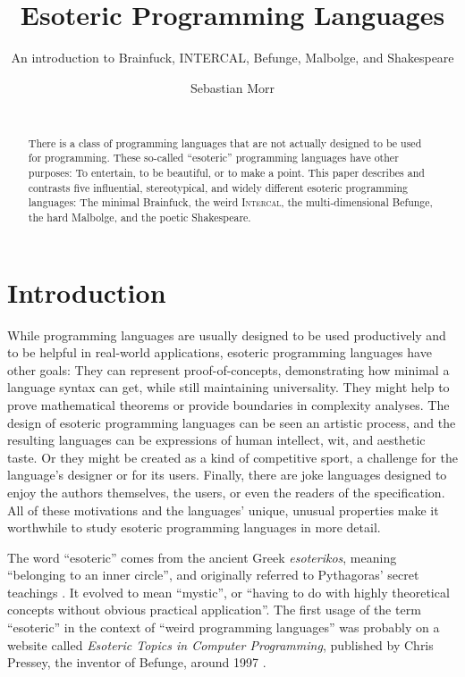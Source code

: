 \documentclass{sig-alternate}
\title{Esoteric Programming Languages}
\subtitle{An introduction to Brainfuck, INTERCAL, Befunge, Malbolge, and Shakespeare}
\author{\alignauthor Sebastian Morr\\\affaddr{Braunschweig University of Technology}\\\email{sebastian@morr.cc}}
\newcommand{\ic}{\textsc{In\-ter\-cal}}
\begin{document}
\maketitle

\begin{abstract}
    There is a class of programming languages that are not actually designed to be used for programming. These so-called “esoteric” programming languages have other purposes: To entertain, to be beautiful, or to make a point.
    This paper describes and contrasts five influential, stereotypical, and widely different esoteric programming languages: The minimal Brainfuck, the weird \ic{}, the multi-dimensional Befunge, the hard Malbolge, and the poetic Shakespeare.
\end{abstract}

\section{Introduction}
\label{introduction}

While programming languages are usually designed to be used productively and to be helpful in real-world applications, esoteric programming languages have other goals: They can represent proof-of-concepts, demonstrating how minimal a language syntax can get, while still maintaining universality. They might help to prove mathematical theorems or provide boundaries in complexity analyses. The design of esoteric programming languages can be seen an artistic process, and the resulting languages can be expressions of human intellect, wit, and aesthetic taste. Or they might be created as a kind of competitive sport, a challenge for the language's designer or for its users. Finally, there are joke languages designed to enjoy the authors themselves, the users, or even the readers of the specification. All of these motivations and the languages' unique, unusual properties make it worthwhile to study esoteric programming languages in more detail.

The word “esoteric” comes from the ancient Greek \emph{esoterikos}, meaning “belonging to an inner circle”, and originally referred to Pythagoras' secret teachings \cite{harper2014esoteric}. It evolved to mean “mystic”, or “having to do with highly theoretical concepts without obvious practical application”. The first usage of the term “esoteric” in the context of “weird programming languages” was probably on a website called \emph{Esoteric Topics in Computer Programming}, published by Chris Pressey, the inventor of Befunge, around 1997 \cite{pressey2005chris}.
\end{document}
